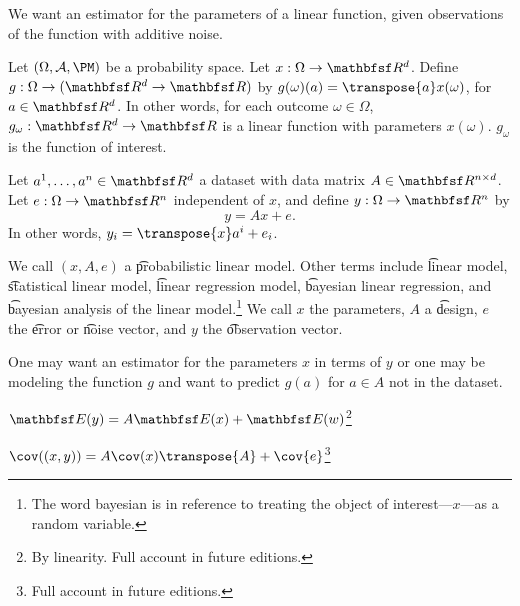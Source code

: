 

We want an estimator for the parameters of a linear function, given observations of the function with additive noise.


Let $(\Omega, \CA, \PM)$ be a probability space.
Let $x: \Omega \to \R^d$.
Define $g: \Omega \to (\R^d \to \R)$ by $g(\omega)(a) = \transpose{a}x(\omega)$, for $a \in \R^d$.
In other words, for each outcome $\omega \in \Omega$, $g_\omega: \R^d \to \R$ is a linear function with parameters $x(\omega)$.
$g_\omega$ is the function of interest.


Let $a^1, \dots, a^n \in \R^d$ a dataset with data matrix $A \in \R^{n \times d}$.
Let $e: \Omega \to \R^n$ independent of $x$, and define $y: \Omega \to \R^n$ by
\[
  y = Ax + e.
\]
In other words, $y_i = \transpose{x}a^i + e_i$.

We call $(x, A, e)$ a \t{probabilistic linear model}.
Other terms include \t{linear model}, \t{statistical linear model}, \t{linear regression model}, \t{bayesian linear regression}, and \t{bayesian analysis of the linear model}.\footnote{The word bayesian is in reference to treating the object of interest---$x$---as a random variable.}
We call $x$ the parameters, $A$ a \t{design}, $e$ the \t{error} or \t{noise} vector, and $y$ the \t{observation} vector.

One may want an estimator for the parameters $x$ in terms of $y$ or one may be modeling the function $g$ and want to predict $g(a)$ for $a \in A$ not in the dataset.


\begin{proposition}
  $\E(y) = A\E(x) + \E(w)$\footnote{By linearity. Full account in future editions.}
\end{proposition}

\begin{proposition}
  $\cov((x, y)) = A\cov(x)\transpose{A} + \cov{e}$\footnote{Full account in future editions.}
\end{proposition}
